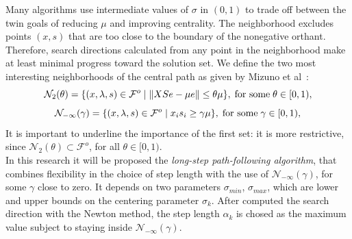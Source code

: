 \documentclass[a4paper,10 pt,titlepage,twoside]{book}
\theoremstyle{plain}
\theoremstyle{definition}
\theoremstyle{remark}
\begin{document}
 Many algorithms use intermediate values of $\sigma$ in $(0,1)$ to trade off between the twin goals of reducing $\mu$ and improving centrality. The neighborhood excludes points $(x, s) $ that are too close to the boundary of the nonegative orthant. Therefore, search directions calculated from any point in the neighborhood make at least minimal progress toward the solution set.
 We define the two most interesting neighborhoods of the central path as given
by Mizuno et al~\cite{5}:\\
\begin{equation*}
\mathcal{N}_{2}(\theta) =\{(x, \lambda,s)\in\mathcal{F}^{o} \;|\;\lVert XSe - \mu e \rVert \leq \theta \mu \}, \text{\;for some\;} \theta \in [0,1),
\end{equation*} 
\begin{equation*}
\mathcal{N}_{-\infty}(\gamma) =\{ (x, \lambda,s)\in\mathcal{F}^{o} \;|\; x_{i}s_{i} \geq \gamma \mu \}, \text{\;for some\;} \gamma \in [0,1),
\end{equation*} 
It is important to underline the importance of the first set: it is more restrictive, since $\mathcal{N}_{2}(\theta) \subset\mathcal{F}^{o}$, for all $\theta\in[0,1)$.\\
In this research it will be proposed the \textit{long-step path-following algorithm}, that combines flexibility in the choice of step length with the use of $\mathcal{N}_{-\infty}(\gamma)$, for some $\gamma$ close to zero. It depends on two parameters $\sigma_{min}$, $\sigma_{max}$, which are lower and upper bounds on the centering parameter $\sigma_{k}$. After computed the search direction with the Newton method, the step length $\alpha_{k}$ is chosed as the maximum value subject to staying inside $\mathcal{N}_{-\infty}(\gamma)$.
\end{document}
